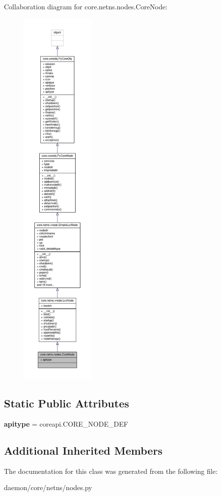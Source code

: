Collaboration diagram for core.\+netns.\+nodes.\+Core\+Node\+:
\nopagebreak
\begin{figure}[H]
\begin{center}
\leavevmode
\includegraphics[height=550pt]{classcore_1_1netns_1_1nodes_1_1_core_node__coll__graph}
\end{center}
\end{figure}
\subsection*{Static Public Attributes}
\begin{DoxyCompactItemize}
\item 
\hypertarget{classcore_1_1netns_1_1nodes_1_1_core_node_a69596f2552cf10aafb7a1bd612699f46}{{\bfseries apitype} = coreapi.\+C\+O\+R\+E\+\_\+\+N\+O\+D\+E\+\_\+\+D\+E\+F}\label{classcore_1_1netns_1_1nodes_1_1_core_node_a69596f2552cf10aafb7a1bd612699f46}

\end{DoxyCompactItemize}
\subsection*{Additional Inherited Members}


The documentation for this class was generated from the following file\+:\begin{DoxyCompactItemize}
\item 
daemon/core/netns/nodes.\+py\end{DoxyCompactItemize}
